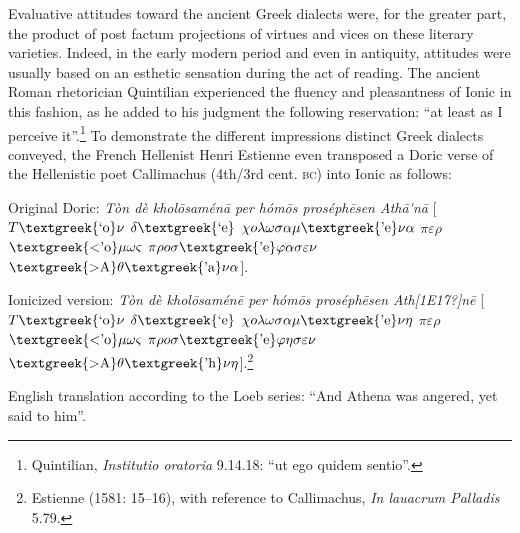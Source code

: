\begin{styleStandard}
Evaluative attitudes toward the ancient Greek dialects were, for the greater part, the product of post factum projections of virtues and vices on these literary varieties. Indeed, in the early modern period and even in antiquity, attitudes were usually based on an esthetic sensation during the act of reading. The ancient Roman rhetorician Quintilian experienced the fluency and pleasantness of Ionic in this fashion, as he added to his judgment the following reservation: “at least as I perceive it”.\footnote{ Quintilian, \textit{Institutio oratoria} 9.14.18: “ut ego quidem sentio”.} To demonstrate the different impressions distinct Greek dialects conveyed, the French Hellenist Henri Estienne even transposed a Doric verse of the Hellenistic poet Callimachus (4th/3rd cent. \textsc{bc}) into Ionic as follows:
\end{styleStandard}

\begin{styleQuote}
Original Doric: \textit{Tòn dè khol\=osamén\=a per hóm\=os proséph\=esen Ath\={a}\'{ }n\=a} [$T\text{\textgreek{`o}}\nu $ $\delta \text{\textgreek{`e}}$ $\chi o\lambda \omega \sigma \alpha \mu \text{\textgreek{'e}}\nu \alpha $ $\pi \varepsilon \rho $ $\text{\textgreek{<'o}}\mu \omega \varsigma $ $\pi \rho o\sigma \text{\textgreek{'e}}\varphi \alpha \sigma \varepsilon \nu $ $\text{\textgreek{>A}}\theta \text{\textgreek{'a}}\nu \alpha $].
\end{styleQuote}

\begin{styleQuote}
Ionicized version: \textit{Tòn dè khol\=osamén\=e per hóm\=os proséph\=esen Ath[1E17?]n\=e} [$T\text{\textgreek{`o}}\nu $ $\delta \text{\textgreek{`e}}$ $\chi o\lambda \omega \sigma \alpha \mu \text{\textgreek{'e}}\nu \eta $ $\pi \varepsilon \rho $ $\text{\textgreek{<'o}}\mu \omega \varsigma $ $\pi \rho o\sigma \text{\textgreek{'e}}\varphi \eta \sigma \varepsilon \nu $ $\text{\textgreek{>A}}\theta \text{\textgreek{'h}}\nu \eta $].\footnote{ Estienne (1581: 15–16), with reference to Callimachus, \textit{In lauacrum Palladis} 5.79.}
\end{styleQuote}

\begin{styleQuote}
English translation according to the Loeb series: “And Athena was angered, yet said to him”.
\end{styleQuote}

